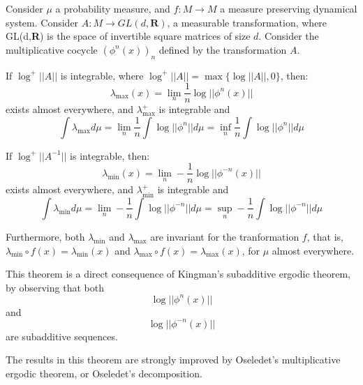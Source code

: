 \documentclass[12pt]{article}
\begin{document}
Consider $\mu$ a probability measure, and $f:M\rightarrow M$ a measure preserving dynamical system. Consider $A:M\rightarrow GL(d,\textbf{R})$, a measurable transformation, where GL(d,\textbf{R}) is the space of invertible square matrices of size $d$.
Consider the multiplicative cocycle $(\phi^n(x))_n$ defined by the transformation $A$.

If $\log^+||A||$ is integrable, where $\log^+||A||=\max\{ \log ||A||,0\}$, then:
$$\lambda_{\max}(x)=\lim_n \frac{1}{n} \log ||\phi^n(x)||$$
exists almost everywhere, and $\lambda^+_{\max}$ is integrable and
$$\int \lambda_{\max} d\mu = \lim_n \frac{1}{n} \int \log ||\phi^n|| d\mu = \inf_n \frac{1}{n} \int \log ||\phi^n||d\mu$$

If $\log^+||A^{-1}||$ is integrable, then:
$$\lambda_{\min}(x)=\lim_n -\frac{1}{n} \log ||\phi^{-n}(x)||$$
exists almost everywhere, and $\lambda^+_{\min}$ is integrable and
$$\int \lambda_{\min} d\mu = \lim_n -\frac{1}{n} \int \log ||\phi^{-n}|| d\mu = \sup_n -\frac{1}{n} \int \log ||\phi^{-n}||d\mu$$

Furthermore, both $\lambda_{\min}$ and $\lambda_{\max}$ are invariant for the tranformation $f$, that is, $\lambda_{\min}\circ f(x)=\lambda_{\min}(x)$ and $\lambda_{\max}\circ f(x)=\lambda_{\max}(x)$, for $\mu$ almost everywhere.

This theorem is a direct consequence of Kingman's subadditive ergodic theorem, by observing that both
$$\log ||\phi^n(x)||$$ and $$\log ||\phi^{-n}(x)||$$ are subadditive sequences.

The results in this theorem are strongly improved by Oseledet's multiplicative ergodic theorem, or Oseledet's decomposition.
\end{document}
